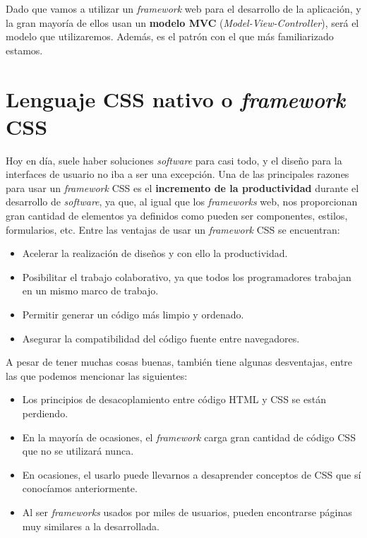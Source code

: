 Dado que vamos a utilizar un \textit{framework} web para el desarrollo de la aplicación, y
la gran mayoría de ellos usan un \textbf{modelo MVC} (\textit{Model-View-Controller}), será
el modelo que utilizaremos. Además, es el patrón con el que más familiarizado estamos.

\section{Lenguaje CSS nativo o \textit{framework} CSS} \label{sec:css-frameworkcss}
Hoy en día, suele haber soluciones \textit{software} para casi todo, y el diseño para la
interfaces de usuario no iba a ser una excepción. Una de las principales razones para usar
un \textit{framework} CSS es el \textbf{incremento de la productividad} durante el desarrollo
de \textit{software}, ya que, al igual que los \textit{frameworks} web, nos proporcionan gran
cantidad de elementos ya definidos como pueden ser componentes, estilos, formularios, etc.
Entre las ventajas de usar un \textit{framework} CSS se encuentran:

    \begin{itemize}
        \item Acelerar la realización de diseños y con ello la productividad.
        \item Posibilitar el trabajo colaborativo, ya que todos los programadores
        trabajan en un mismo marco de trabajo.
        \item Permitir generar un código más limpio y ordenado.
        \item Asegurar la compatibilidad del código fuente entre navegadores.
    \end{itemize}

A pesar de tener muchas cosas buenas, también tiene algunas desventajas, entre las que
podemos mencionar las siguientes:

    \begin{itemize}
        \item Los principios de desacoplamiento entre código HTML y CSS se están perdiendo.
        \item En la mayoría de ocasiones, el \textit{framework} carga gran cantidad de
        código CSS que no se utilizará nunca.
        \item En ocasiones, el usarlo puede llevarnos a desaprender conceptos de CSS que sí
        conocíamos anteriormente.
        \item Al ser \textit{frameworks} usados por miles de usuarios, pueden encontrarse
        páginas muy similares a la desarrollada.
    \end{itemize}

